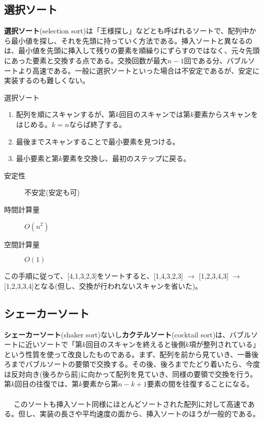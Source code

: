 \subsection{選択ソート}
\textbf{選択ソート}(selection sort)は「王様探し」などとも呼ばれるソートで、配列中から最小値を探し、それを先頭に持っていく方法である。挿入ソートと異なるのは、最小値を先頭に挿入して残りの要素を順繰りにずらすのではなく、元々先頭にあった要素と交換する点である。交換回数が最大$n-1$回である分、バブルソートより高速である。一般に選択ソートといった場合は不安定であるが、安定に実装するのも難しくない。
\begin{itembox}[l]{選択ソート}
\begin{enumerate}
\item 配列を順にスキャンするが、第$k$回目のスキャンでは第$k$要素からスキャンをはじめる。$k=n$ならば終了する。
\item 最後までスキャンすることで最小要素を見つける。
\item 最小要素と第$k$要素を交換し、最初のステップに戻る。
\end{enumerate}
\begin{multicols}{3}
\begin{description}
\item[安定性] 不安定(安定も可)
\item[時間計算量] $O(n^2)$
\item[空間計算量] $O(1)$
\end{description}
\end{multicols}
\end{itembox}

この手順に従って、[4,1,3,2,3]をソートすると、[1,4,3,2,3] $\rightarrow$ [1,2,3,4,3] $\rightarrow$ [1,2,3,3,4]となる(但し、交換が行われないスキャンを省いた)。

\subsection{シェーカーソート}
\textbf{シェーカーソート}(shaker sort)ないし\textbf{カクテルソート}(cocktail sort)は、バブルソートに近いソートで「第$k$回目のスキャンを終えると後側$k$項が整列されている」という性質を使って改良したものである。まず、配列を前から見ていき、一番後ろまでバブルソートの要領で交換する。その後、後ろまでたどり着いたら、今度は反対向き(後ろから前)に向かって配列を見ていき、同様の要領で交換を行う。第$k$回目の往復では、第$k$要素から第$n-k+1$要素の間を往復することになる。
\\ \\　
このソートも挿入ソート同様にほとんどソートされた配列に対して高速である。但し、実装の長さや平均速度の面から、挿入ソートのほうが一般的である。

